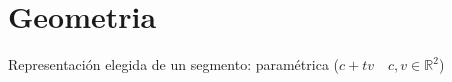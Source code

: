 \section{Geometria}




Representación elegida de un segmento: paramétrica ($c + tv \quad c, v \in \mathds{R}^2$)


